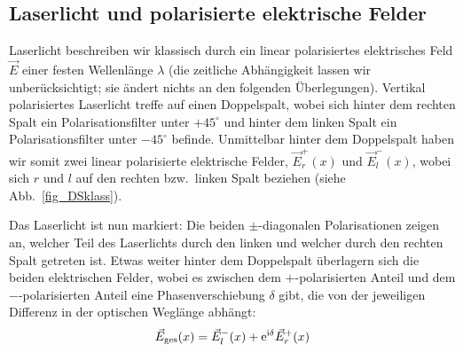 \subsection{Laserlicht und polarisierte elektrische Felder}

Laserlicht beschreiben wir klassisch durch ein linear polarisiertes elektrisches
Feld $\vec{E}$ einer festen Wellenl\"ange $\lambda$ (die zeitliche Abh\"angigkeit lassen wir
unber\"ucksichtigt; sie \"andert nichts an den folgenden \"Uberlegungen). 
Vertikal polarisiertes Laserlicht treffe auf einen Doppelspalt, wobei
sich hinter dem rechten Spalt ein Polarisationsfilter unter $+45^\circ$ und hinter dem
linken Spalt ein Polarisationsfilter unter $-45^\circ$ befinde. Unmittelbar hinter dem
Doppelspalt haben wir somit zwei linear polarisierte elektrische Felder, $\vec{E}^+_r(x)$ und
$\vec{E}^-_l(x)$, wobei sich $r$ und $l$ auf den rechten bzw.\ linken Spalt 
beziehen (siehe Abb.\ \ref{fig_DSklass}). 

Das Laserlicht ist nun markiert: Die beiden $\pm$-diagonalen Polarisationen zeigen
an, welcher Teil des Laserlichts durch den linken und welcher durch den rechten Spalt
getreten ist. Etwas weiter hinter dem Doppelspalt \"uberlagern sich die beiden elektrischen
Felder, wobei es zwischen dem $+$-polarisierten Anteil und dem $-$-polarisierten Anteil
eine Phasenverschiebung $\delta$ gibt, die von der jeweiligen Differenz in der optischen 
Wegl\"ange abh\"angt:
\begin{equation}
                  \vec{E}_{\rm ges}(x) = \vec{E}^-_l(x) + {\rm e}^{{\rm i}\delta} \vec{E}^+_r(x) 
\end{equation}


